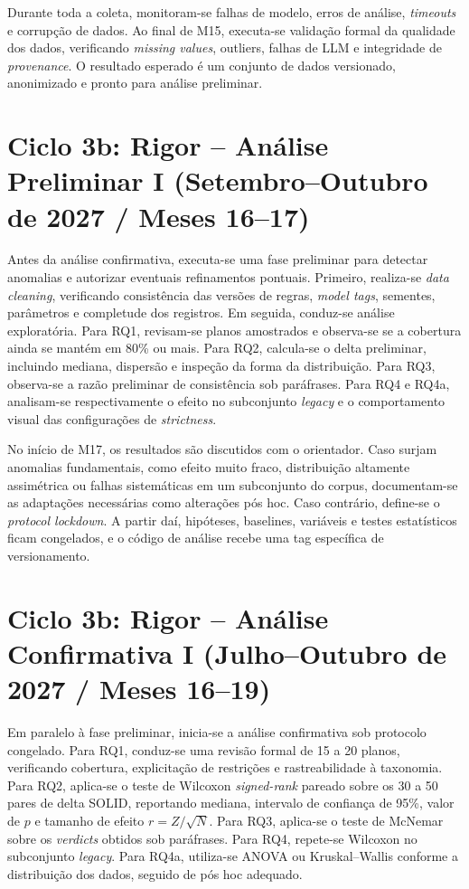 \documentclass[12pt,a4paper]{article}
\begin{document}
Durante toda a coleta, monitoram-se falhas de modelo, erros de análise, \textit{timeouts} e corrupção de dados. Ao final de M15, executa-se validação formal da qualidade dos dados, verificando \textit{missing values}, outliers, falhas de LLM e integridade de \textit{provenance}. O resultado esperado é um conjunto de dados versionado, anonimizado e pronto para análise preliminar.

\section*{Ciclo 3b: Rigor -- Análise Preliminar I (Setembro--Outubro de 2027 / Meses 16--17)}

Antes da análise confirmativa, executa-se uma fase preliminar para detectar anomalias e autorizar eventuais refinamentos pontuais. Primeiro, realiza-se \textit{data cleaning}, verificando consistência das versões de regras, \textit{model tags}, sementes, parâmetros e completude dos registros. Em seguida, conduz-se análise exploratória. Para RQ1, revisam-se planos amostrados e observa-se se a cobertura ainda se mantém em 80\% ou mais. Para RQ2, calcula-se o delta preliminar, incluindo mediana, dispersão e inspeção da forma da distribuição. Para RQ3, observa-se a razão preliminar de consistência sob paráfrases. Para RQ4 e RQ4a, analisam-se respectivamente o efeito no subconjunto \textit{legacy} e o comportamento visual das configurações de \textit{strictness}.

No início de M17, os resultados são discutidos com o orientador. Caso surjam anomalias fundamentais, como efeito muito fraco, distribuição altamente assimétrica ou falhas sistemáticas em um subconjunto do corpus, documentam-se as adaptações necessárias como alterações pós hoc. Caso contrário, define-se o \textit{protocol lockdown}. A partir daí, hipóteses, baselines, variáveis e testes estatísticos ficam congelados, e o código de análise recebe uma tag específica de versionamento.

\section*{Ciclo 3b: Rigor -- Análise Confirmativa I (Julho--Outubro de 2027 / Meses 16--19)}

Em paralelo à fase preliminar, inicia-se a análise confirmativa sob protocolo congelado. Para RQ1, conduz-se uma revisão formal de 15 a 20 planos, verificando cobertura, explicitação de restrições e rastreabilidade à taxonomia. Para RQ2, aplica-se o teste de Wilcoxon \textit{signed-rank} pareado sobre os 30 a 50 pares de delta SOLID, reportando mediana, intervalo de confiança de 95\%, valor de $p$ e tamanho de efeito $r = Z / \sqrt{N}$. Para RQ3, aplica-se o teste de McNemar sobre os \textit{verdicts} obtidos sob paráfrases. Para RQ4, repete-se Wilcoxon no subconjunto \textit{legacy}. Para RQ4a, utiliza-se ANOVA ou Kruskal--Wallis conforme a distribuição dos dados, seguido de pós hoc adequado.
\end{document}
